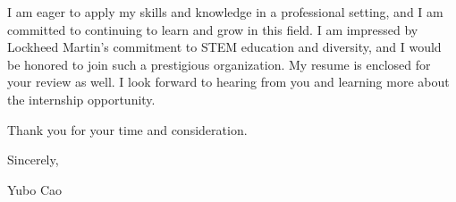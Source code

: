 I am eager to apply my skills and knowledge in a professional setting, and I am committed to continuing to learn and grow in this field. I am impressed by Lockheed Martin's commitment to STEM education and diversity, and I would be honored to join such a prestigious organization. My resume is enclosed for your review as well. I look forward to hearing from you and learning more about the internship opportunity.

Thank you for your time and consideration.

\bigskip

Sincerely,

\bigskip

Yubo Cao

\newpage
